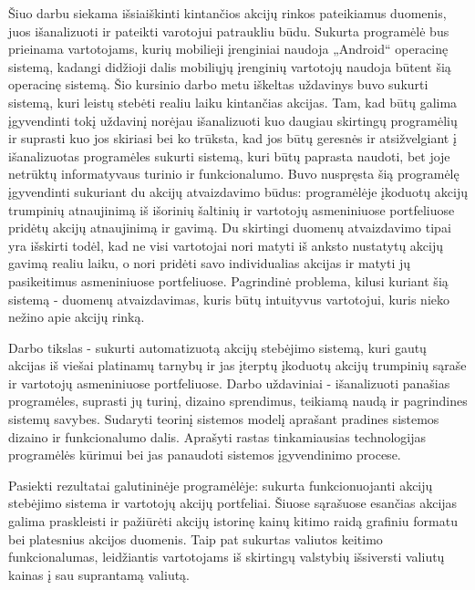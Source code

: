 Šiuo darbu siekama išsiaiškinti kintančios akcijų rinkos pateikiamus duomenis, juos išanalizuoti ir pateikti varotojui patraukliu būdu. Sukurta programėlė bus prieinama vartotojams, kurių mobilieji įrenginiai naudoja „Android“ operacinę sistemą, kadangi didžioji dalis mobiliųjų įrenginių vartotojų naudoja būtent šią operacinę sistemą. Šio kursinio darbo metu iškeltas uždavinys buvo sukurti sistemą, kuri leistų stebėti realiu laiku kintančias akcijas. Tam, kad būtų galima įgyvendinti tokį uždavinį norėjau išanalizuoti kuo daugiau skirtingų programėlių ir suprasti kuo jos skiriasi bei ko trūksta, kad jos būtų geresnės ir atsižvelgiant į išanalizuotas programėles sukurti sistemą, kuri būtų paprasta naudoti, bet joje netrūktų informatyvaus turinio ir funkcionalumo. Buvo nuspręsta šią programėlę įgyvendinti sukuriant du akcijų atvaizdavimo būdus: programėlėje įkoduotų akcijų trumpinių atnaujinimą iš išorinių šaltinių ir vartotojų asmeniniuose portfeliuose pridėtų akcijų atnaujinimą ir gavimą. Du skirtingi duomenų atvaizdavimo tipai yra išskirti todėl, kad ne visi vartotojai nori matyti iš anksto nustatytų akcijų gavimą realiu laiku, o nori pridėti savo individualias akcijas ir matyti jų pasikeitimus asmeniniuose portfeliuose. Pagrindinė problema, kilusi kuriant šią sistemą - duomenų atvaizdavimas, kuris būtų intuityvus vartotojui, kuris nieko nežino apie akcijų rinką.

Darbo tikslas - sukurti automatizuotą akcijų stebėjimo sistemą, kuri gautų akcijas iš viešai platinamų tarnybų ir jas įterptų įkoduotų akcijų trumpinių sąraše ir vartotojų asmeniniuose portfeliuose. Darbo uždaviniai - išanalizuoti panašias programėles, suprasti jų turinį, dizaino sprendimus, teikiamą naudą ir pagrindines sistemų savybes. Sudaryti teorinį sistemos modelį aprašant pradines sistemos dizaino ir funkcionalumo dalis. Aprašyti rastas tinkamiausias technologijas programėlės kūrimui bei jas panaudoti sistemos įgyvendinimo procese.

Pasiekti rezultatai galutininėje programėlėje: sukurta funkcionuojanti akcijų stebėjimo sistema ir vartotojų akcijų portfeliai. Šiuose sąrašuose esančias akcijas galima praskleisti ir pažiūrėti akcijų istorinę kainų kitimo raidą grafiniu formatu bei platesnius akcijos duomenis. Taip pat sukurtas valiutos keitimo funkcionalumas, leidžiantis vartotojams iš skirtingų valstybių išsiversti valiutų kainas į sau suprantamą valiutą.